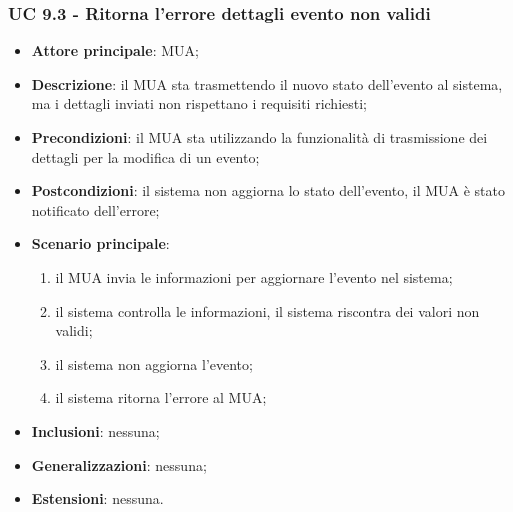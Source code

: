 \subsubsection{UC 9.3 - Ritorna l'errore dettagli evento non validi} \label{sec:UC9.3}
    \begin{itemize}
        \item \textbf{Attore principale}: MUA;
        \item \textbf{Descrizione}: il MUA sta trasmettendo il nuovo stato dell'evento al sistema, ma i dettagli inviati non rispettano i requisiti richiesti;
        \item \textbf{Precondizioni}: il MUA sta utilizzando la funzionalità di trasmissione dei dettagli per la modifica di un evento;
        \item \textbf{Postcondizioni}: il sistema non aggiorna lo stato dell'evento, il MUA è stato notificato dell'errore;
        \item \textbf{Scenario principale}:
            \begin{enumerate}
                \item il MUA invia le informazioni per aggiornare l'evento nel sistema;
                \item il sistema controlla le informazioni, il sistema riscontra dei valori non validi;
                \item il sistema non aggiorna l'evento;
                \item il sistema ritorna l'errore al MUA;
            \end{enumerate}
        \item \textbf{Inclusioni}: nessuna;
        \item \textbf{Generalizzazioni}: nessuna;
        \item \textbf{Estensioni}: nessuna.
    \end{itemize}